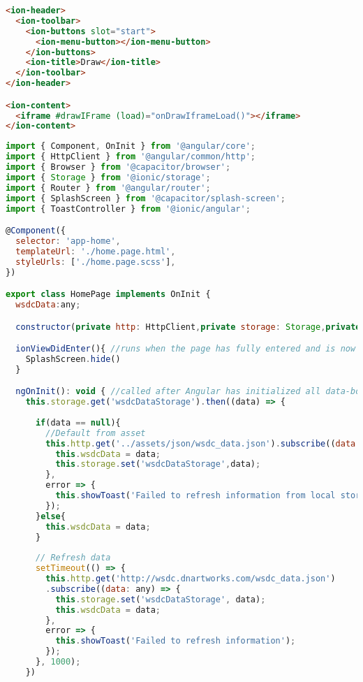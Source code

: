 \begin{lstlisting}[language=html, label={lst:draw.page.html}, caption=draw.page.html]
<ion-header>
  <ion-toolbar>
    <ion-buttons slot="start">
      <ion-menu-button></ion-menu-button>
    </ion-buttons>
    <ion-title>Draw</ion-title>
  </ion-toolbar>
</ion-header>

<ion-content>
  <iframe #drawIFrame (load)="onDrawIframeLoad()"></iframe>
</ion-content>
\end{lstlisting} 

\begin{lstlisting}[language=JavaScript, label={lst:home.page.ts}, caption=home.page.ts]
import { Component, OnInit } from '@angular/core';
import { HttpClient } from '@angular/common/http';
import { Browser } from '@capacitor/browser';
import { Storage } from '@ionic/storage';
import { Router } from '@angular/router';
import { SplashScreen } from '@capacitor/splash-screen';
import { ToastController } from '@ionic/angular';

@Component({
  selector: 'app-home',
  templateUrl: './home.page.html',
  styleUrls: ['./home.page.scss'],
})

export class HomePage implements OnInit {
  wsdcData:any;

  constructor(private http: HttpClient,private storage: Storage,private router: Router,public toastController: ToastController) { }

  ionViewDidEnter(){ //runs when the page has fully entered and is now the active page.
    SplashScreen.hide()
  }

  ngOnInit(): void { //called after Angular has initialized all data-bound properties of a directive
    this.storage.get('wsdcDataStorage').then((data) => {
      
      if(data == null){
        //Default from asset
        this.http.get('../assets/json/wsdc_data.json').subscribe((data: any) => {
          this.wsdcData = data;
          this.storage.set('wsdcDataStorage',data);       
        },
        error => {
          this.showToast('Failed to refresh information from local storage');
        });
      }else{    
        this.wsdcData = data;
      }
      
      // Refresh data
      setTimeout(() => {
        this.http.get('http://wsdc.dnartworks.com/wsdc_data.json')
        .subscribe((data: any) => {
          this.storage.set('wsdcDataStorage', data);
          this.wsdcData = data;
        },
        error => {
          this.showToast('Failed to refresh information');
        });
      }, 1000);
    })
    

\end{lstlisting}
